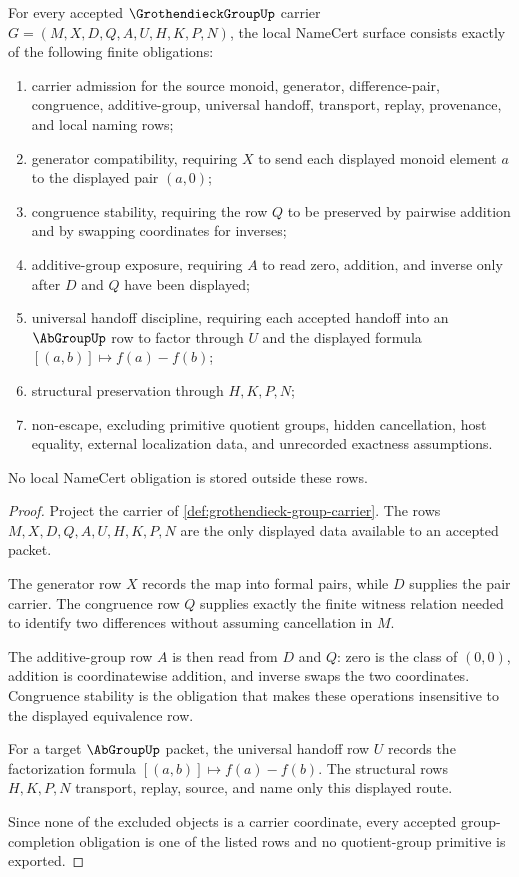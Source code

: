 \begin{theorem}
\label{thm:grothendieck-group-obligation-surface}
For every accepted $\GrothendieckGroupUp$ carrier
$G=(M,X,D,Q,A,U,H,K,P,N)$, the local NameCert surface consists exactly of the following finite obligations:
\begin{enumerate}
\item carrier admission for the source monoid, generator, difference-pair, congruence, additive-group, universal handoff, transport, replay, provenance, and local naming rows;
\item generator compatibility, requiring $X$ to send each displayed monoid element $a$ to the displayed pair $(a,0)$;
\item congruence stability, requiring the row $Q$ to be preserved by pairwise addition and by swapping coordinates for inverses;
\item additive-group exposure, requiring $A$ to read zero, addition, and inverse only after $D$ and $Q$ have been displayed;
\item universal handoff discipline, requiring each accepted handoff into an $\AbGroupUp$ row to factor through $U$ and the displayed formula $[(a,b)]\mapsto f(a)-f(b)$;
\item structural preservation through $H,K,P,N$;
\item non-escape, excluding primitive quotient groups, hidden cancellation, host equality, external localization data, and unrecorded exactness assumptions.
\end{enumerate}
No local NameCert obligation is stored outside these rows.
\end{theorem}
\begin{proof}
Project the carrier of \autoref{def:grothendieck-group-carrier}. The rows $M,X,D,Q,A,U,H,K,P,N$ are the only displayed data available to an accepted packet.

The generator row $X$ records the map into formal pairs, while $D$ supplies the pair carrier. The congruence row $Q$ supplies exactly the finite witness relation needed to identify two differences without assuming cancellation in $M$.

The additive-group row $A$ is then read from $D$ and $Q$: zero is the class of $(0,0)$, addition is coordinatewise addition, and inverse swaps the two coordinates. Congruence stability is the obligation that makes these operations insensitive to the displayed equivalence row.

For a target $\AbGroupUp$ packet, the universal handoff row $U$ records the factorization formula $[(a,b)]\mapsto f(a)-f(b)$. The structural rows $H,K,P,N$ transport, replay, source, and name only this displayed route.

Since none of the excluded objects is a carrier coordinate, every accepted group-completion obligation is one of the listed rows and no quotient-group primitive is exported.
\end{proof}

